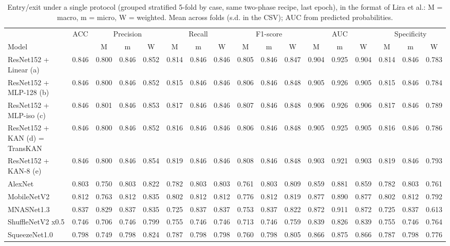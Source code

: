 \begin{table}[t]
\centering
\caption{Entry/exit under a single protocol (grouped stratified 5-fold by case, same two-phase recipe, last epoch), in the format of Lira et al.: M = macro, m = micro, W = weighted. Mean across folds (s.d. in the CSV); AUC from predicted probabilities.}
\label{tab:mmw_es}
\scriptsize
\setlength{\tabcolsep}{2.5pt}
\begin{tabular}{lcccccccccccccccc}
\hline
 & ACC & \multicolumn{3}{c}{Precision} & \multicolumn{3}{c}{Recall} & \multicolumn{3}{c}{F1-score} & \multicolumn{3}{c}{AUC} & \multicolumn{3}{c}{Specificity} \\
Model & & M & m & W & M & m & W & M & m & W & M & m & W & M & m & W \\
\hline
ResNet152 + Linear (a) & 0.846 & 0.800 & 0.846 & 0.852 & 0.814 & 0.846 & 0.846 & 0.805 & 0.846 & 0.847 & 0.904 & 0.925 & 0.904 & 0.814 & 0.846 & 0.783 \\
ResNet152 + MLP-128 (b) & 0.846 & 0.800 & 0.846 & 0.852 & 0.815 & 0.846 & 0.846 & 0.806 & 0.846 & 0.848 & 0.905 & 0.926 & 0.905 & 0.815 & 0.846 & 0.784 \\
ResNet152 + MLP-iso (c) & 0.846 & 0.801 & 0.846 & 0.853 & 0.817 & 0.846 & 0.846 & 0.807 & 0.846 & 0.848 & 0.906 & 0.926 & 0.906 & 0.817 & 0.846 & 0.789 \\
ResNet152 + KAN (d) = TransKAN & 0.846 & 0.800 & 0.846 & 0.852 & 0.816 & 0.846 & 0.846 & 0.806 & 0.846 & 0.848 & 0.905 & 0.925 & 0.905 & 0.816 & 0.846 & 0.786 \\
ResNet152 + KAN-8 (e) & 0.846 & 0.800 & 0.846 & 0.854 & 0.819 & 0.846 & 0.846 & 0.808 & 0.846 & 0.848 & 0.903 & 0.921 & 0.903 & 0.819 & 0.846 & 0.793 \\
AlexNet & 0.803 & 0.750 & 0.803 & 0.822 & 0.782 & 0.803 & 0.803 & 0.761 & 0.803 & 0.809 & 0.859 & 0.881 & 0.859 & 0.782 & 0.803 & 0.761 \\
MobileNetV2 & 0.812 & 0.763 & 0.812 & 0.835 & 0.802 & 0.812 & 0.812 & 0.776 & 0.812 & 0.819 & 0.877 & 0.890 & 0.877 & 0.802 & 0.812 & 0.792 \\
MNASNet1.3 & 0.837 & 0.829 & 0.837 & 0.835 & 0.725 & 0.837 & 0.837 & 0.753 & 0.837 & 0.822 & 0.872 & 0.911 & 0.872 & 0.725 & 0.837 & 0.613 \\
ShuffleNetV2 x0.5 & 0.746 & 0.706 & 0.746 & 0.799 & 0.755 & 0.746 & 0.746 & 0.713 & 0.746 & 0.759 & 0.839 & 0.826 & 0.839 & 0.755 & 0.746 & 0.764 \\
SqueezeNet1.0 & 0.798 & 0.749 & 0.798 & 0.824 & 0.787 & 0.798 & 0.798 & 0.760 & 0.798 & 0.805 & 0.866 & 0.875 & 0.866 & 0.787 & 0.798 & 0.776 \\

\end{tabular}
\end{table}
